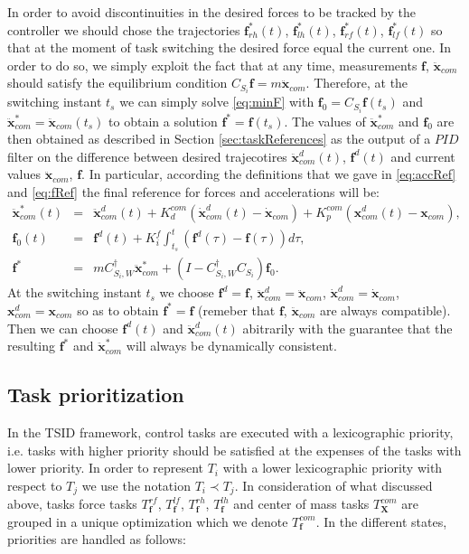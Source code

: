 \documentclass[12pt,a4paper,twoside]{article}
\begin{document}
In order to avoid discontinuities in the desired forces to be tracked by the controller we should chose the trajectories ${{\bm f}}_{rh}^*(t)$, ${{\bm f}}_{lh}^*(t)$, ${{\bm f}}_{rf}^*(t)$, ${{\bm f}}_{lf}^*(t)$ so that at the moment of task switching the desired force equal the current one. In order to do so, we simply exploit the fact that at any time, measurements $\bm f$, $ \ddot {\bm x}_{com}$ should satisfy the equilibrium condition $C_{S_i} \bm f = m \ddot {\bm x}_{com}$. Therefore, at the switching instant $t_s$ we can simply solve \eqref{eq:minF} with $\bm f_0 = C_{S_i} \bm f (t_s) $ and $\ddot {\bm x}^*_{com} = \ddot {\bm x}_{com}(t_s)$ to obtain a solution $\bm f^* = \bm f (t_s)$. The values of $\ddot {\bm x}^*_{com}$ and $\bm f_0$ are then obtained as described in Section \ref{sec:taskReferences} as the output of a $PID$ filter on the difference between desired trajecotires $\ddot {\bm x}^d_{com} (t)$, $\bm f^d(t)$ and current values $\ddot {\bm x}_{com}$, $\bm f$. In particular, according the definitions that we gave in \eqref{eq:accRef} and \eqref{eq:fRef} the final reference for forces and accelerations will be:
\begin{eqnarray*} 
\ddot {\bm x}_{com}^* (t) &=& \ddot {\bm x}_{com}^d (t) + K_d^{com} \left( \dot {\bm x}_{com}^d (t) - \dot {\bm x}_{com}\right) + K_p^{com} \left( {\bm x}_{com}^d (t) - {\bm x}_{com}\right), \\
{\bm f}_0 (t) & = & {\bm f}^d (t) + K_i^f \int_{t_s}^t \left( {\bm f}^d (\tau) - {\bm f} (\tau) \right) d \tau,\\
\bm f^* & =&  m  C_{S_i, W}^\dagger \ddot {{\bm x}}_{com}^*+ (I - C_{S_i, W}^\dagger C_{S_i}) \bm f_0.
\end{eqnarray*}
At the switching instant $t_s$ we choose $\bm f^d = \bm f $, $\ddot {\bm x}^d_{com} = \ddot {\bm x}_{com}$, $\dot {\bm x}^d_{com} = \dot {\bm x}_{com}$, $ {\bm x}^d_{com} = {\bm x}_{com}$ so as to obtain $\bm f^* = \bm f$ (remeber that $\bm f$, $ \ddot {\bm x}_{com}$ are always compatible). Then we can choose $\bm f^d (t)$ and $\ddot {\bm x}^d_{com}(t)$ abitrarily with the guarantee that the resulting $\bm f^*$ and $\ddot {\bm x}_{com}^*$ will always be dynamically consistent.

\subsection{Task prioritization} \label{sec:taskPrioritization}

In the TSID framework, control tasks are executed with a lexicographic priority, i.e. tasks with higher priority should be satisfied at the expenses of the tasks with lower priority. In order to represent $T_i$ with a lower lexicographic priority with respect to $T_j$ we use the notation $T_i \prec T_j$. In consideration of what discussed above, tasks force tasks $T^{rf}_{\bm f}$, $T^{lf}_{\bm f}$, $T^{rh}_{\bm f}$, $T^{lh}_{\bm f}$ and center of mass tasks $T^{com}_{\bm X}$ are grouped in a unique optimization which we denote $T^{com}_{\bm f}$. In the different states, priorities are handled as follows:
\end{document}
